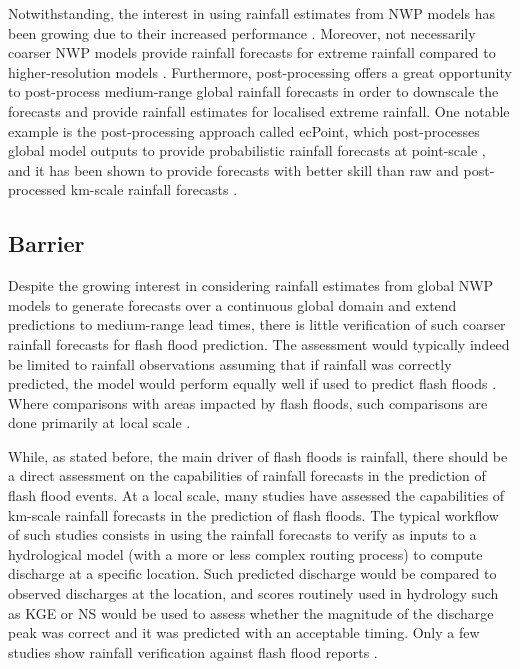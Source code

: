 Notwithstanding, the interest in using rainfall estimates from NWP models has been growing due to their increased performance \citep{Bucherie_2022b}. Moreover, not necessarily coarser NWP models provide rainfall forecasts for extreme rainfall compared to higher-resolution models \citep{Hewson_2024a, Zeman_2021}. Furthermore, post-processing offers a great opportunity to post-process medium-range global rainfall forecasts in order to downscale the forecasts and provide rainfall estimates for localised extreme rainfall. One notable example is the post-processing approach called ecPoint, which post-processes global model outputs to provide probabilistic rainfall forecasts at point-scale \citep{Hewson_2021}, and it has been shown to provide forecasts with better skill than raw and post-processed km-scale rainfall forecasts \citep{Gascón_2024}. 

\subsection{Barrier}
Despite the growing interest in considering rainfall estimates from global NWP models to generate forecasts over a continuous global domain and extend predictions to medium-range lead times, there is little verification of such coarser rainfall forecasts for flash flood prediction. The assessment would typically indeed be limited to rainfall observations assuming that if rainfall was correctly predicted, the model would perform equally well if used to predict flash floods \citep{Gascón_2024}. Where comparisons with areas impacted by flash floods, such comparisons are done primarily at local scale \citep{Tripathy_2020}.

While, as stated before, the main driver of flash floods is rainfall, there should be a direct assessment on the capabilities of rainfall forecasts in the prediction of flash flood events. At a local scale, many studies have assessed the capabilities of km-scale rainfall forecasts in the prediction of flash floods. The typical workflow of such studies consists in using the rainfall forecasts to verify as inputs to a hydrological model (with a more or less complex routing process) to compute discharge at a specific location. Such predicted discharge would be compared to observed discharges at the location, and scores routinely used in hydrology such as KGE or NS would be used to assess whether the magnitude of the discharge peak was correct and it was predicted with an acceptable timing. Only a few studies show rainfall verification against flash flood reports \citep{Herman_2018}.

